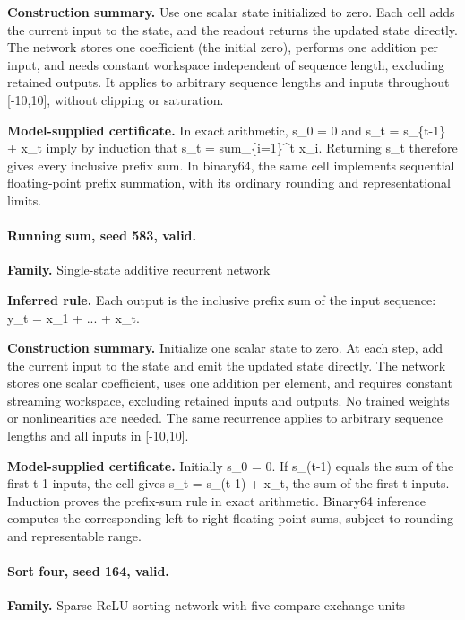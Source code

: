 \textbf{Construction summary.} Use one scalar state initialized to zero. Each cell adds the current input to the state, and the readout returns the updated state directly. The network stores one coefficient (the initial zero), performs one addition per input, and needs constant workspace independent of sequence length, excluding retained outputs. It applies to arbitrary sequence lengths and inputs throughout [-10,10], without clipping or saturation.


\textbf{Model-supplied certificate.} In exact arithmetic, s\_0 = 0 and s\_t = s\_\{t-1\} + x\_t imply by induction that s\_t = sum\_\{i=1\}\textasciicircum{}t x\_i. Returning s\_t therefore gives every inclusive prefix sum. In binary64, the same cell implements sequential floating-point prefix summation, with its ordinary rounding and representational limits.


\paragraph{Running sum, seed 583, valid.}

\textbf{Family.} Single-state additive recurrent network


\textbf{Inferred rule.} Each output is the inclusive prefix sum of the input sequence: y\_t = x\_1 + ... + x\_t.


\textbf{Construction summary.} Initialize one scalar state to zero. At each step, add the current input to the state and emit the updated state directly. The network stores one scalar coefficient, uses one addition per element, and requires constant streaming workspace, excluding retained inputs and outputs. No trained weights or nonlinearities are needed. The same recurrence applies to arbitrary sequence lengths and all inputs in [-10,10].


\textbf{Model-supplied certificate.} Initially s\_0 = 0. If s\_(t-1) equals the sum of the first t-1 inputs, the cell gives s\_t = s\_(t-1) + x\_t, the sum of the first t inputs. Induction proves the prefix-sum rule in exact arithmetic. Binary64 inference computes the corresponding left-to-right floating-point sums, subject to rounding and representable range.


\paragraph{Sort four, seed 164, valid.}

\textbf{Family.} Sparse ReLU sorting network with five compare-exchange units


